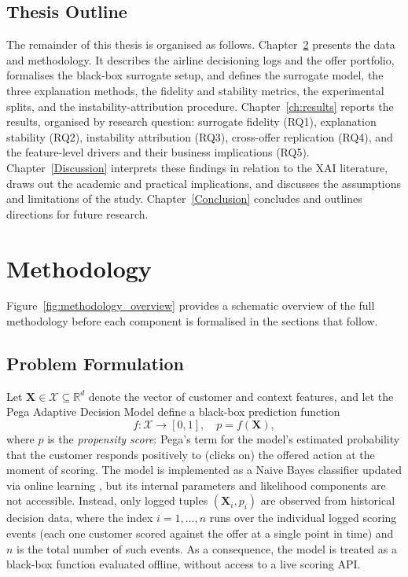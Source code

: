 \documentclass[oneside]{memoir} %
\begin{document}
\section{Thesis Outline}

The remainder of this thesis is organised as follows. Chapter~\ref{Methodology} presents the data and methodology. It describes the airline decisioning logs and the offer portfolio, formalises the black-box surrogate setup, and defines the surrogate model, the three explanation methods, the fidelity and stability metrics, the experimental splits, and the instability-attribution procedure. Chapter~\ref{ch:results} reports the results, organised by research question: surrogate fidelity (RQ1), explanation stability (RQ2), instability attribution (RQ3), cross-offer replication (RQ4), and the feature-level drivers and their business implications (RQ5). Chapter~\ref{Discussion} interprets these findings in relation to the XAI literature, draws out the academic and practical implications, and discusses the assumptions and limitations of the study. Chapter~\ref{Conclusion} concludes and outlines directions for future research.

\chapter{Methodology} \label{Methodology}

Figure~\ref{fig:methodology_overview} provides a schematic overview of the full methodology before each component is formalised in the sections that follow.

\section{Problem Formulation} \label{sec:formulation}

Let $\mathbf{X} \in \mathcal{X} \subseteq \mathbb{R}^d$ denote the vector of customer and context features, and let the Pega Adaptive Decision Model define a black-box prediction function
\[
f: \mathcal{X} \rightarrow [0,1], \quad p = f(\mathbf{X}),
\]
where $p$ is the \emph{propensity score}: Pega's term for the model's estimated probability that the customer responds positively to (clicks on) the offered action at the moment of scoring. The model is implemented as a Naive Bayes classifier updated via online learning \parencite{pegasystems_adm_2026, pegasystems_pegasystems_2025}, but its internal parameters and likelihood components are not accessible. Instead, only logged tuples $(\mathbf{X}_i, p_i)$ are observed from historical decision data, where the index $i = 1, \ldots, n$ runs over the individual logged scoring events (each one customer scored against the offer at a single point in time) and $n$ is the total number of such events. As a consequence, the model is treated as a black-box function evaluated offline, without access to a live scoring API.
\end{document}
